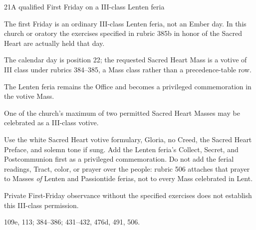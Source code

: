 \begin{casefile}{21}{A qualified First Friday on a III-class Lenten feria}
\item[Calendar facts] The first Friday is an ordinary III-class Lenten feria, not an Ember day.  In this church or oratory the exercises specified in rubric 385b in honor of the Sacred Heart are actually held that day.
\item[Ranks and rows] The calendar day is position 22; the requested Sacred Heart Mass is a votive of III class under rubrics 384--385, a Mass class rather than a precedence-table row.
\item[Impeded item] The Lenten feria remains the Office and becomes a privileged commemoration in the votive Mass.
\item[Mass category] One of the church's maximum of two permitted Sacred Heart Masses may be celebrated as a III-class votive.
\item[Assembly] Use the white Sacred Heart votive formulary, Gloria, no Creed, the Sacred Heart Preface, and solemn tone if sung.  Add the Lenten feria's Collect, Secret, and Postcommunion first as a privileged commemoration.  Do not add the ferial readings, Tract, color, or prayer over the people: rubric 506 attaches that prayer to Masses \emph{of} Lenten and Passiontide ferias, not to every Mass celebrated in Lent.
\item[Boundary] Private First-Friday observance without the specified exercises does not establish this III-class permission.
\item[Rubric locus] 109e, 113; 384--386; 431--432, 476d, 491, 506.
\end{casefile}

